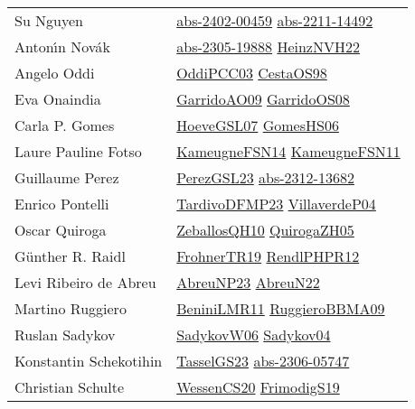 {\begin{longtable}{p{4cm}p{20cm}}
Su Nguyen & \href{articles/abs-2402-00459.pdf}{abs-2402-00459}\cite{abs-2402-00459} \href{articles/abs-2211-14492.pdf}{abs-2211-14492}\cite{abs-2211-14492} \\
Anton{\'{\i}}n Nov{\'{a}}k & \href{articles/abs-2305-19888.pdf}{abs-2305-19888}\cite{abs-2305-19888} \href{articles/HeinzNVH22.pdf}{HeinzNVH22}\cite{HeinzNVH22} \\
Angelo Oddi & \href{papers/OddiPCC03.pdf}{OddiPCC03}\cite{OddiPCC03} \href{papers/CestaOS98.pdf}{CestaOS98}\cite{CestaOS98} \\
Eva Onaindia & \href{articles/GarridoAO09.pdf}{GarridoAO09}\cite{GarridoAO09} \href{articles/GarridoOS08.pdf}{GarridoOS08}\cite{GarridoOS08} \\
Carla P. Gomes & \href{papers/HoeveGSL07.pdf}{HoeveGSL07}\cite{HoeveGSL07} \href{papers/GomesHS06.pdf}{GomesHS06}\cite{GomesHS06} \\
Laure Pauline Fotso & \href{articles/KameugneFSN14.pdf}{KameugneFSN14}\cite{KameugneFSN14} \href{papers/KameugneFSN11.pdf}{KameugneFSN11}\cite{KameugneFSN11} \\
Guillaume Perez & \href{papers/PerezGSL23.pdf}{PerezGSL23}\cite{PerezGSL23} \href{articles/abs-2312-13682.pdf}{abs-2312-13682}\cite{abs-2312-13682} \\
Enrico Pontelli & \href{papers/TardivoDFMP23.pdf}{TardivoDFMP23}\cite{TardivoDFMP23} \href{}{VillaverdeP04}\cite{VillaverdeP04} \\
Oscar Quiroga & \href{articles/ZeballosQH10.pdf}{ZeballosQH10}\cite{ZeballosQH10} \href{papers/QuirogaZH05.pdf}{QuirogaZH05}\cite{QuirogaZH05} \\
G{\"{u}}nther R. Raidl & \href{papers/FrohnerTR19.pdf}{FrohnerTR19}\cite{FrohnerTR19} \href{papers/RendlPHPR12.pdf}{RendlPHPR12}\cite{RendlPHPR12} \\
Levi Ribeiro de Abreu & \href{}{AbreuNP23}\cite{AbreuNP23} \href{articles/AbreuN22.pdf}{AbreuN22}\cite{AbreuN22} \\
Martino Ruggiero & \href{articles/BeniniLMR11.pdf}{BeniniLMR11}\cite{BeniniLMR11} \href{articles/RuggieroBBMA09.pdf}{RuggieroBBMA09}\cite{RuggieroBBMA09} \\
Ruslan Sadykov & \href{}{SadykovW06}\cite{SadykovW06} \href{papers/Sadykov04.pdf}{Sadykov04}\cite{Sadykov04} \\
Konstantin Schekotihin & \href{papers/TasselGS23.pdf}{TasselGS23}\cite{TasselGS23} \href{articles/abs-2306-05747.pdf}{abs-2306-05747}\cite{abs-2306-05747} \\
Christian Schulte & \href{papers/WessenCS20.pdf}{WessenCS20}\cite{WessenCS20} \href{papers/FrimodigS19.pdf}{FrimodigS19}\cite{FrimodigS19} \\

\end{longtable}}
